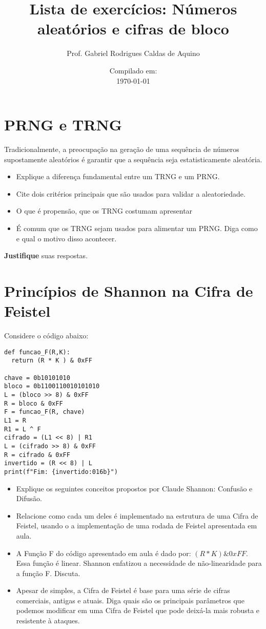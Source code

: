 \title{Lista de exercícios: Números aleatórios e cifras de bloco}
\author{Prof. Gabriel Rodrigues Caldas de Aquino}
\date{Compilado em: \\ \today}



\maketitle

\section{PRNG e TRNG}
Tradicionalmente, a preocupação na geração de uma sequência de números supostamente aleatórios é garantir que a sequência seja estatisticamente aleatória. 
\begin{itemize}
    \item Explique a diferença fundamental entre um TRNG e um PRNG.
    \item Cite dois critérios principais que são usados para validar a aleatoriedade.
    \item O que é propensão, que os TRNG costumam apresentar
    \item É comum que os TRNG sejam usados para alimentar um PRNG. Diga como e qual o motivo disso acontecer.
\end{itemize}
\textbf{Justifique} suas respostas.


\section{Princípios de Shannon na Cifra de Feistel} 

Considere o código abaixo:
\begin{verbatim}
def funcao_F(R,K):
  return (R * K ) & 0xFF

chave = 0b10101010                   
bloco = 0b1100110010101010   
L = (bloco >> 8) & 0xFF
R = bloco & 0xFF 
F = funcao_F(R, chave)
L1 = R
R1 = L ^ F
cifrado = (L1 << 8) | R1 
L = (cifrado >> 8) & 0xFF
R = cifrado & 0xFF
invertido = (R << 8) | L
print(f"Fim: {invertido:016b}")      
\end{verbatim}

\begin{itemize}
    \item Explique os seguintes conceitos propostos por Claude Shannon: Confusão e Difusão. 
    \item Relacione como cada um deles é implementado na estrutura de uma Cifra de Feistel, usando o a implementação de uma rodada de Feistel apresentada em aula.
    \item A Função F do código apresentado em aula é dado por: $(R * K) \& 0xFF$. Essa função é linear. Shannon enfatizou a necessidade de não-linearidade para a função F. Discuta.
    \item Apesar de simples, a Cifra de Feistel é base para uma série de cifras comerciais, antigas e atuais. Diga quais são os principais parâmetros que podemos modificar em uma Cifra de Feistel que pode deixá-la mais robusta e resistente à ataques.
\end{itemize}

